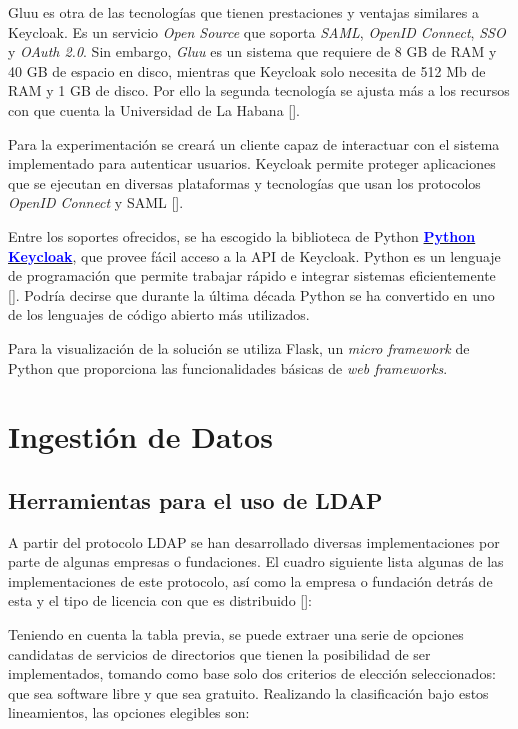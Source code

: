 Gluu es otra de las tecnologías que tienen prestaciones y ventajas similares a Keycloak. Es un servicio \textit{Open Source} que soporta \textit{SAML}, \textit{OpenID Connect}, \textit{SSO} y \textit{OAuth 2.0}. Sin embargo, \textit{Gluu} es un sistema que requiere de 8 GB de RAM y 40 GB de espacio en disco, mientras que Keycloak solo necesita de 512 Mb de RAM y 1 GB de disco. Por ello la segunda tecnología se ajusta más a los recursos con que cuenta  la Universidad de La Habana [\cite{vassallo2017continuous}].

Para la experimentación se creará un cliente capaz de interactuar con el sistema implementado para autenticar usuarios. Keycloak permite proteger aplicaciones que se ejecutan en diversas plataformas y tecnologías que usan los protocolos \textit{OpenID Connect } y SAML [\cite{secure_apps_2022}]. 

Entre los soportes ofrecidos, se ha escogido la biblioteca de Python \href{https://pypi.org/project/python-keycloak/}{\textcolor{blue}{\textbf{Python Keycloak}}}, que provee fácil acceso a la API de Keycloak. Python es un lenguaje de programación que permite trabajar rápido e integrar sistemas eficientemente [\cite{python_2022}]. Podría decirse que durante la última década Python se ha convertido en uno de los lenguajes de código abierto más utilizados.

Para la visualización de la solución se utiliza Flask, un \textit{micro framework} de Python que proporciona las funcionalidades básicas de\textit{ web frameworks}.

\section{Ingestión de Datos}

\subsection{Herramientas para el uso de LDAP}

A partir del protocolo LDAP se han desarrollado diversas implementaciones por parte de algunas empresas o fundaciones. El cuadro siguiente lista algunas de las implementaciones de este protocolo, así como la empresa o fundación detrás de esta y el tipo de licencia con que es distribuido [\cite{gonzalez2010implementacion}]:



Teniendo en cuenta la tabla previa, se puede extraer una serie de opciones candidatas de servicios de directorios que tienen la posibilidad de ser implementados, tomando como base solo dos criterios de elección seleccionados: que sea software libre y que sea gratuito. Realizando la clasificación bajo estos
lineamientos, las opciones elegibles son:

